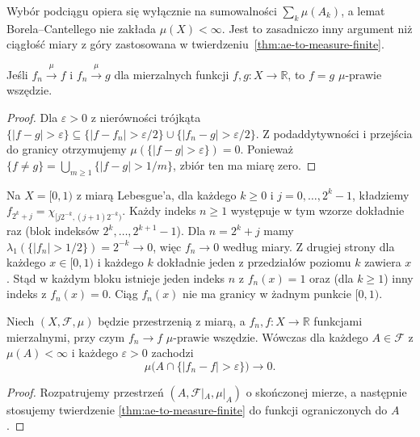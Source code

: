 \begin{uwaga}
Wybór podciągu opiera się wyłącznie na sumowalności
$\sum_k\mu(A_k)$, a lemat Borela--Cantellego nie
zakłada $\mu(X)<\infty$. Jest to zasadniczo inny
argument niż ciągłość miary z góry zastosowana w
twierdzeniu~\ref{thm:ae-to-measure-finite}.
\end{uwaga}

\begin{wniosek}
\label{cor:measure-limit-unique}
Jeśli $f_n\xrightarrow{\mu}f$ i
$f_n\xrightarrow{\mu}g$ dla mierzalnych funkcji
$f,g:X\to\mathbb R$, to $f=g$ $\mu$-prawie wszędzie.
\end{wniosek}
\begin{proof}
Dla $\varepsilon>0$ z nierówności trójkąta
$\{|f-g|>\varepsilon\}\subseteq
\{|f-f_n|>\varepsilon/2\}\cup
\{|f_n-g|>\varepsilon/2\}$.
Z podaddytywności i przejścia do granicy
otrzymujemy $\mu(\{|f-g|>\varepsilon\})=0$.
Ponieważ $\{f\ne g\}=\bigcup_{m\ge1}\{|f-g|>1/m\}$,
zbiór ten ma miarę zero.
\end{proof}

\begin{przyklad}
\label{ex:typewriter}
Na $X=[0,1)$ z miarą Lebesgue'a, dla każdego $k\ge0$
i $j=0,\ldots,2^k-1$, kładziemy
$f_{2^k+j}=\chi_{[j2^{-k},(j+1)2^{-k})}$.
Każdy indeks $n\ge1$ występuje w tym wzorze dokładnie
raz (blok indeksów $2^k,\ldots,2^{k+1}-1$).
Dla $n=2^k+j$ mamy
$\lambda_1(\{|f_n|>1/2\})=2^{-k}\to0$,
więc $f_n\to0$ według miary.
Z drugiej strony dla każdego $x\in[0,1)$ i każdego
$k$ dokładnie jeden z przedziałów poziomu $k$
zawiera $x$. Stąd w każdym bloku istnieje jeden indeks
$n$ z $f_n(x)=1$ oraz (dla $k\ge1$) inny indeks
z $f_n(x)=0$. Ciąg $f_n(x)$ nie ma granicy w żadnym
punkcie $[0,1)$.
\end{przyklad}

\begin{twierdzenie}
\label{thm:local-convergence-measure}
Niech $(X,\mathcal F,\mu)$ będzie przestrzenią z miarą,
a $f_n,f:X\to\mathbb R$ funkcjami mierzalnymi,
przy czym $f_n\to f$ $\mu$-prawie wszędzie.
Wówczas dla każdego $A\in\mathcal F$ z $\mu(A)<\infty$
i każdego $\varepsilon>0$ zachodzi
\[
\mu\bigl(A\cap\{|f_n-f|>\varepsilon\}\bigr)\longrightarrow0.
\]
\end{twierdzenie}
\begin{proof}
Rozpatrujemy przestrzeń
$(A,\mathcal F|_A,\mu|_A)$ o skończonej mierze,
a następnie stosujemy twierdzenie
\ref{thm:ae-to-measure-finite} do funkcji ograniczonych
do $A$.
\end{proof}

